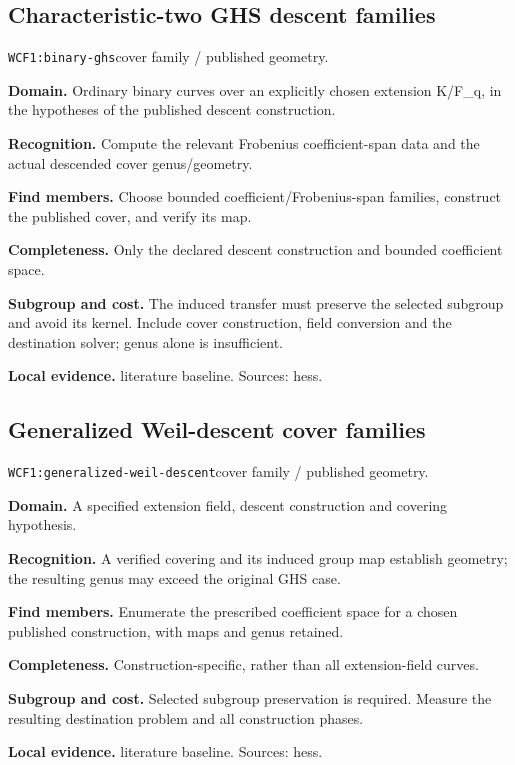\documentclass[10pt]{article}
\begin{document}
\subsection{Characteristic-two GHS descent families}
\texttt{WCF1:binary-ghs}\quad cover family / published geometry.\par
\textbf{Domain.} Ordinary binary curves over an explicitly chosen extension K/F\_q, in the hypotheses of the published descent construction.\par
\textbf{Recognition.} Compute the relevant Frobenius coefficient-span data and the actual descended cover genus/geometry.\par
\textbf{Find members.} Choose bounded coefficient/Frobenius-span families, construct the published cover, and verify its map.\par
\textbf{Completeness.} Only the declared descent construction and bounded coefficient space.\par
\textbf{Subgroup and cost.} The induced transfer must preserve the selected subgroup and avoid its kernel. Include cover construction, field conversion and the destination solver; genus alone is insufficient.\par
\textbf{Local evidence.} literature baseline. Sources: hess.
\subsection{Generalized Weil-descent cover families}
\texttt{WCF1:generalized-weil-descent}\quad cover family / published geometry.\par
\textbf{Domain.} A specified extension field, descent construction and covering hypothesis.\par
\textbf{Recognition.} A verified covering and its induced group map establish geometry; the resulting genus may exceed the original GHS case.\par
\textbf{Find members.} Enumerate the prescribed coefficient space for a chosen published construction, with maps and genus retained.\par
\textbf{Completeness.} Construction-specific, rather than all extension-field curves.\par
\textbf{Subgroup and cost.} Selected subgroup preservation is required. Measure the resulting destination problem and all construction phases.\par
\textbf{Local evidence.} literature baseline. Sources: hess.
\end{document}

